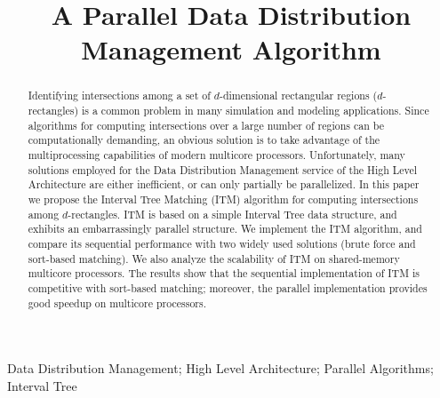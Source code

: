 \documentclass[10pt, conference, compsocconf]{IEEEtran}
\begin{document}
\title{A Parallel Data Distribution Management Algorithm\footnotemark}

\author{
\and
{}
}

\maketitle


\begin{abstract}
Identifying intersections among a set of $d$-dimensional rectangular
regions ($d$-rectangles) is a common problem in many simulation and
modeling applications. Since algorithms for computing intersections
over a large number of regions can be computationally demanding, an
obvious solution is to take advantage of the multiprocessing
capabilities of modern multicore processors. Unfortunately, many
solutions employed for the Data Distribution Management service of the
High Level Architecture are either inefficient, or can only partially
be parallelized. In this paper we propose the Interval Tree Matching
(ITM) algorithm for computing intersections among $d$-rectangles. ITM
is based on a simple Interval Tree data structure, and exhibits an
embarrassingly parallel structure. We implement the ITM algorithm, and
compare its sequential performance with two widely used solutions
(brute force and sort-based matching). We also analyze the scalability
of ITM on shared-memory multicore processors. The results show that
the sequential implementation of ITM is competitive with sort-based
matching; moreover, the parallel implementation provides good speedup
on multicore processors.
\end{abstract}

\begin{IEEEkeywords}
Data Distribution Management; High Level Architecture; Parallel Algorithms; Interval Tree
\end{IEEEkeywords}
\end{document}
